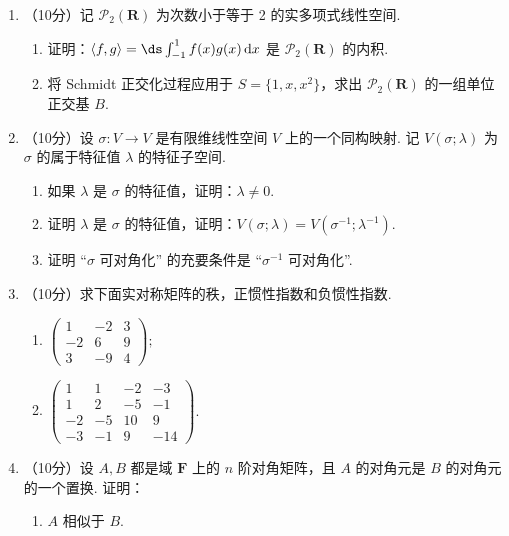 \begin{enumerate}
\item （10分）记 $\mathcal{P}_2(\mathbf{R})$ 为次数小于等于 2 的实多项式线性空间.
\begin{enumerate}
    \item 证明：$\langle f,g\rangle =\ds\int_{-1}^1f(x)g(x)\,\mathrm{d}x$ 是 $\mathcal{P}_2(\mathbf{R})$ 的内积.

    \item 将 Schmidt 正交化过程应用于 $S=\{1,x,x^2\}$，求出 $\mathcal{P}_2(\mathbf{R})$ 的一组单位正交基 $B$.
\end{enumerate}

\item （10分）设 $\sigma\colon V\to V$ 是有限维线性空间 $V$ 上的一个同构映射. 记 $V(\sigma;\lambda)$ 为 $\sigma$ 的属于特征值 $\lambda$ 的特征子空间.
    \begin{enumerate}
        \item 如果 $\lambda$ 是 $\sigma$ 的特征值，证明：$\lambda \neq 0$.

        \item 证明 $\lambda$ 是 $\sigma$ 的特征值，证明：$V(\sigma;\lambda)=V(\sigma^{-1};\lambda^{-1})$.

        \item 证明 ``$\sigma$ 可对角化'' 的充要条件是 ``$\sigma^{-1}$ 可对角化''.
    \end{enumerate}

\item （10分）求下面实对称矩阵的秩，正惯性指数和负惯性指数.
    \begin{enumerate}
        \item $\begin{pmatrix}1 & -2 & 3 \\ -2 & 6 & 9 \\ 3 & -9 & 4\end{pmatrix};$

        \item $\begin{pmatrix}1 & 1 & -2 & -3\\ 1 & 2 & -5 & -1 \\ -2 & -5 & 10 & 9 \\ -3 & -1 & 9 & -14\end{pmatrix}$.
    \end{enumerate}

\item （10分）设 $A,B$ 都是域 $\mathbf{F}$ 上的 $n$ 阶对角矩阵，且 $A$ 的对角元是 $B$ 的对角元的一个置换. 证明：
    \begin{enumerate}
        \item $A$ 相似于 $B$.


\end{enumerate}
\end{enumerate}

